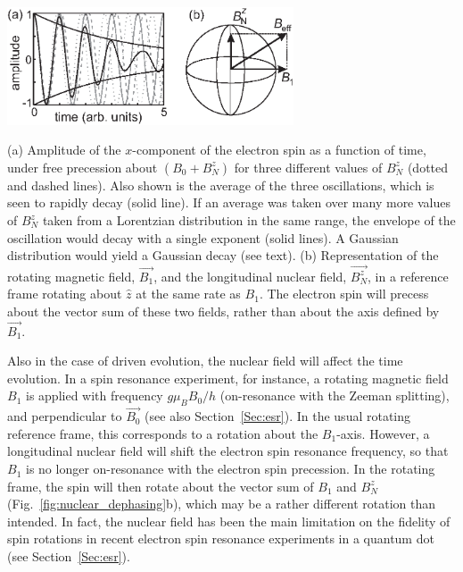 \documentclass[12pt,aps,nofootinbib]{revtex4-1}
\begin{document}
\bfig
\begin{center}
\includegraphics[width=8.5cm]{hanson_fig26.eps}
\end{center}
\caption{(a) Amplitude of the $x$-component of the electron spin
as a function of time, under free precession about $(B_0 + B_N^z)$
for three different values of $B_N^z$ (dotted and dashed lines).
Also shown is the average of the three oscillations, which is seen
to rapidly decay (solid line). If an average was taken over many
more values of $B_N^z$ taken from a Lorentzian distribution in the same range, the envelope of the
oscillation would decay with a single exponent (solid lines). A Gaussian distribution would yield a Gaussian decay (see text). (b)
Representation of the rotating magnetic field, $\vec{B_1}$, and
the longitudinal nuclear field, $\vec{B_N^z}$, in a reference
frame rotating about $\hat{z}$ at the same rate as $B_1$. The
electron spin will precess about the vector sum of these two
fields, rather than about the axis defined by $\vec{B_1}$.}
\label{fig:nuclear_dephasing} \efig

Also in the case of driven evolution, the nuclear field will
affect the time evolution. In a spin resonance experiment, for
instance, a rotating magnetic field $B_1$ is applied with
frequency $g \mu_B B_0/h$ (on-resonance with the Zeeman
splitting), and perpendicular to $\vec{B_0}$ (see also
Section~\ref{Sec:esr}). In the usual rotating reference frame,
this corresponds to a rotation about the $B_1$-axis. However, a
longitudinal nuclear field will shift the electron spin resonance
frequency, so that $B_1$ is no longer on-resonance with the
electron spin precession. In the rotating frame, the spin will
then rotate about the vector sum of $B_1$ and $B_N^z$
(Fig.~\ref{fig:nuclear_dephasing}b), which may be a rather
different rotation than intended. In fact, the nuclear field has
been the main limitation on the fidelity of spin rotations in
recent electron spin resonance experiments in a quantum dot (see
Section~\ref{Sec:esr}).
\end{document}
